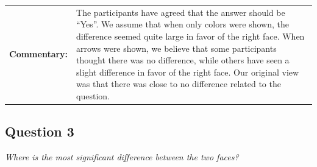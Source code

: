 \begin{tabular}{l p{}}
	{\bf Commentary:} & The participants have agreed that the answer should be ``Yes''. We assume that when only colors were shown, the difference seemed quite large in favor of the right face. When arrows were shown, we believe that some participants thought there was no difference, while others have seen a slight difference in favor of the right face. Our original view was that there was close to no difference related to the question. \\
\end{tabular}

\clearpage

\subsection{Question 3}
\label{attch:complete_study_results-question3}

\begin{center}{\it Where is the most significant difference between the two faces?}\end{center}

